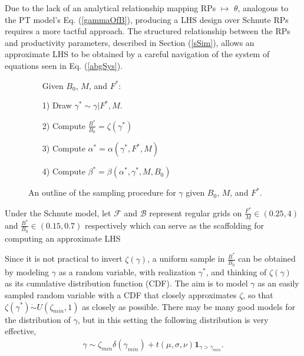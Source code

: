 \documentclass[12pt]{article}
\begin{document}
%




Due to the lack of an analytical relationship mapping RPs $\mapsto$ $\theta$, 
analogous to the PT model's Eq. (\ref{gammaOfB}), producing a LHS design 
over Schnute RPs requires a more tactful approach.
The structured relationship between the RPs and productivity parameters, 
described in Section (\ref{sSim}), allows an approximate LHS to be obtained by 
a careful navigation of the system of equations seen in Eq. (\ref{abgSys}).

%
\begin{figure}
\vspace{-0.5cm}
\begin{itemize}
        \item[] \hspace*{-1cm}Given $B_0$, $M$, and $F^*$:
        \item[1)] Draw $\gamma^* \sim \gamma|F^*, M$.
        \item[2)] Compute $\frac{B^*}{B_0} = \zeta(\gamma^*)$
        \item[3)] Compute $\alpha^* = \alpha(\gamma^*, F^*, M)$
        \item[4)] Compute $\beta^* = \beta(\alpha^*, \gamma^*, M, B_0)$
\end{itemize}
\vspace{-0.5cm}
\caption{ An outline of the sampling procedure for $\gamma$ 
given $B_0$, $M$, and $F^*$.
}
\end{figure}

%
Under the Schnute model, let $\mathcal{F}$ and $\mathcal{B}$ represent regular grids on
\mbox{$\frac{F^*}{M}\in(0.25, 4)$} and \mbox{$\frac{B^*}{B_0}\in(0.15, 0.7)$}
respectively which can serve as the scaffolding for computing an approximate LHS

%
Since it is not practical to invert $\zeta(\gamma)$, a uniform sample in 
$\frac{B^*}{B_0}$ can be obtained by modeling $\gamma$ as a random 
variable, with realization $\gamma^*$, and thinking of $\zeta(\gamma)$ as its 
cumulative distribution function (CDF). The aim is to model $\gamma$ as an 
easily sampled random variable with a CDF that closely approximates $\zeta$, so 
that $\zeta(\gamma^*)\dot\sim U(\zeta_{min},1)$ as closely as possible. There 
may be many good models for the distribution of $\gamma$, but in this setting 
the following distribution is very effective,
%
\begin{align}
\gamma \sim \zeta_{min}\delta(\gamma_{min}) + t(\mu, \sigma, \nu)\bm{1}_{\gamma>\gamma_{min}}. \label{mixT}
\end{align}
\end{document}
